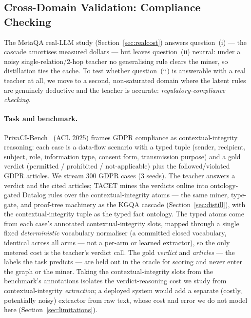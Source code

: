 \documentclass[11pt]{article}
\theoremstyle{plain}
\begin{document}
\subsection{Cross-Domain Validation: Compliance Checking}
\label{sec:compliance}
The MetaQA real-LLM study (Section~\ref{sec:realcost}) answers question~(i) ---
the cascade amortises measured dollars --- but leaves question~(ii) neutral:
under a noisy single-relation/2-hop teacher no generalising rule clears the
miner, so distillation ties the cache. To test whether question~(ii) is
answerable with a real teacher at all, we move to a second, non-saturated
domain where the latent rules are genuinely deductive and the teacher is
accurate: \emph{regulatory-compliance checking}.

\paragraph{Task and benchmark.} PrivaCI-Bench~\citep{privacibench2025} (ACL
2025) frames GDPR compliance as contextual-integrity reasoning: each case is a
data-flow scenario with a typed tuple (sender, recipient, subject, role,
information type, consent form, transmission purpose) and a gold verdict
(permitted / prohibited / not-applicable) plus the followed/violated GDPR
articles. We stream $300$ GDPR cases ($3$ seeds). The teacher answers a
verdict and the cited articles; TACET mines the verdicts online into
ontology-gated Datalog rules over the contextual-integrity atoms --- the same
miner, type-gate, and proof-tree machinery as the KGQA cascade
(Section~\ref{sec:distill}), with the contextual-integrity tuple as the typed
fact ontology. The typed atoms come from each case's annotated
contextual-integrity slots, mapped through a single fixed \emph{deterministic}
vocabulary normaliser (a committed closed vocabulary, identical across all arms
--- not a per-arm or learned extractor), so the only metered cost is the
teacher's verdict call. The gold \emph{verdict} and \emph{articles} --- the
labels the task predicts --- are held out in the oracle for scoring and never
enter the graph or the miner. Taking the contextual-integrity slots from the
benchmark's annotations isolates the verdict-reasoning cost we study from
contextual-integrity \emph{extraction}; a deployed system would add a separate
(costly, potentially noisy) extractor from raw text, whose cost and error we do
not model here (Section~\ref{sec:limitations}).
\end{document}

